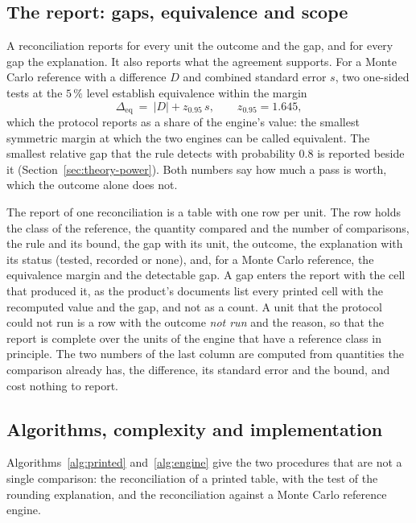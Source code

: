 \subsection{The report: gaps, equivalence and scope}
\label{sec:proposed-report}

A reconciliation reports for every unit the outcome and the gap, and for every gap the explanation. It also reports what the agreement supports. For a Monte Carlo reference with a difference $D$ and combined standard error $s$, two one-sided tests at the $5\,\%$ level establish equivalence within the margin
\begin{equation}
\Delta_{\mathrm{eq}}\ =\ \lvert D\rvert+z_{0.95}\,s,\qquad z_{0.95}=1.645 ,
\label{eq:equivalence}
\end{equation}
which the protocol reports as a share of the engine's value: the smallest symmetric margin at which the two engines can be called equivalent. The smallest relative gap that the rule detects with probability $0.8$ is reported beside it (Section~\ref{sec:theory-power}). Both numbers say how much a pass is worth, which the outcome alone does not.

The report of one reconciliation is a table with one row per unit. The row holds the class of the reference, the quantity compared and the number of comparisons, the rule and its bound, the gap with its unit, the outcome, the explanation with its status (tested, recorded or none), and, for a Monte Carlo reference, the equivalence margin and the detectable gap. A gap enters the report with the cell that produced it, as the product's documents list every printed cell with the recomputed value and the gap, and not as a count. A unit that the protocol could not run is a row with the outcome \emph{not run} and the reason, so that the report is complete over the units of the engine that have a reference class in principle. The two numbers of the last column are computed from quantities the comparison already has, the difference, its standard error and the bound, and cost nothing to report.

\subsection{Algorithms, complexity and implementation}
\label{sec:proposed-impl}

Algorithms~\ref{alg:printed} and~\ref{alg:engine} give the two procedures that are not a single comparison: the reconciliation of a printed table, with the test of the rounding explanation, and the reconciliation against a Monte Carlo reference engine.

